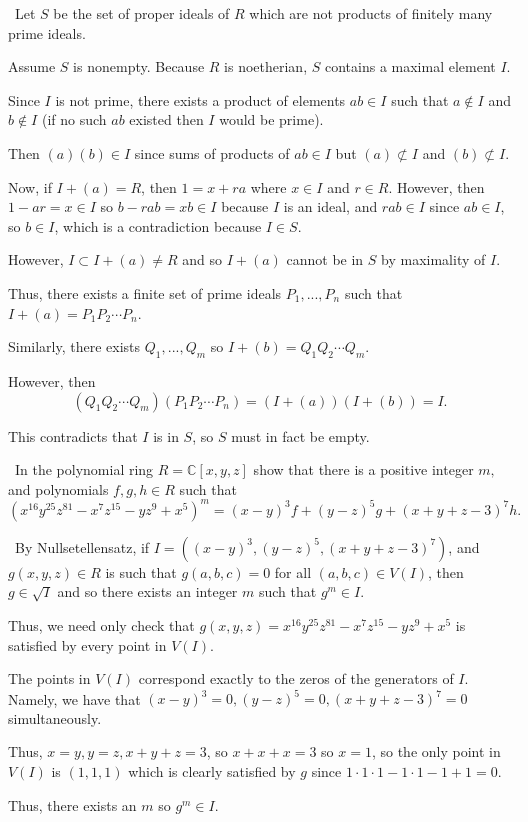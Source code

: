 \documentclass[12pt]{AlgebraQual}
\begin{document}
\begin{solution}$\,$
Let $S$ be the set of proper ideals of $R$ which are not products of finitely many prime ideals.

Assume $S$ is nonempty. Because $R$ is noetherian, $S$ contains a maximal element $I$.

Since $I$ is not prime, there exists a product of elements $ab\in I$ such that $a\notin I$ and $b\notin I$ (if no such $ab$ existed then $I$ would be prime).

Then $(a)(b)\in I$ since sums of products of $ab\in I$ but $(a)\not\subset I$ and $(b)\not\subset I$.

Now, if $I+(a)=R$, then $1=x+ra$ where $x\in I$ and $r\in R$. However, then $1-ar=x\in I$ so $b-rab=xb\in I$ because $I$ is an ideal, and $rab\in I$ since $ab\in I$, so $b\in I$, which is a contradiction because $I\in S$.

However, $I\subset I+(a)\not=R$ and so $I+(a)$ cannot be in $S$ by maximality of $I.$

Thus, there exists a finite set of prime ideals $P_1,...,P_n$ such that $I+(a)=P_1P_2\cdots P_n$.

Similarly, there exists $Q_1,...,Q_m$ so $I+(b)=Q_1Q_2\cdots Q_m$.

However, then $$(Q_1Q_2\cdots Q_m)(P_1P_2\cdots P_n)=(I+(a))(I+(b))=I.$$

This contradicts that $I$ is in $S$, so $S$ must in fact be empty.
\end{solution}
\newpage



\begin{problem} $\,$
In the polynomial ring $R=\mathbb{C}[x,y,z]$ show that there is a positive integer $m,$ and polynomials $f,g,h\in R$ such that $$(x^{16}y^{25}z^{81}-x^7z^{15}-yz^9+x^5)^m=(x-y)^3f+(y-z)^5g+(x+y+z-3)^7h.$$
\end{problem}


\begin{solution}$\,$
By Nullsetellensatz, if $I=((x-y)^3,(y-z)^5,(x+y+z-3)^7)$, and $g(x,y,z)\in R$ is such that $g(a,b,c)=0$ for all $(a,b,c)\in V(I)$, then $g\in\sqrt{I}$ and so there exists an integer $m$ such that $g^m\in I.$

Thus, we need only check that $g(x,y,z)=x^{16}y^{25}z^{81}-x^7z^{15}-yz^9+x^5$ is satisfied by every point in $V(I).$

The points in $V(I)$ correspond exactly to the zeros of the generators of $I$. Namely, we have that $(x-y)^3=0,(y-z)^5=0,(x+y+z-3)^7=0$ simultaneously.

Thus, $x=y,y=z,x+y+z=3$, so $x+x+x=3$ so $x=1$, so the only point in $V(I)$ is $(1,1,1)$ which is clearly satisfied by $g$ since $1\cdot 1\cdot 1-1\cdot 1-1+1=0.$

Thus, there exists an $m$ so $g^m\in I.$
\end{solution}
\newpage
\end{document}
